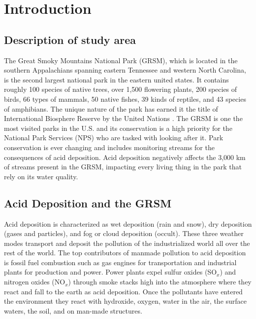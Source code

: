 \chapter{Introduction} \label{ch:intro}

\section{Description of study area}

The Great Smoky Mountains National Park (GRSM), which is located in the southern Appalachians spanning eastern Tennessee and western North Carolina, is the second largest national park in the eastern united states.
It contains roughly 100 species of native trees, over 1,500 flowering plants, 200 species of birds, 66 types of mammals, 50 native fishes, 39 kinds of reptiles, and 43 species of amphibians.
The unique nature of the park has earned it the title of  International Biosphere Reserve by the United Nations \citep{NPS}.    
The GRSM is one the most visited parks in the U.S. and its conservation is a high priority for the National Park Services (NPS) who are tasked with looking after it.        
Park conservation is ever changing and  includes monitoring streams for the consequences of acid deposition.    
Acid deposition negatively affects the 3,000 km of streams present in the GRSM, impacting every living thing in the park that rely on its water quality.  
    
\section{Acid Deposition and the GRSM}

Acid deposition is characterized as wet deposition (rain and snow), dry deposition (gases and particles), and fog or cloud deposition (occult).
These three weather modes transport and deposit the pollution of the industrialized world all over the rest of the world.
The top contributors of  manmade pollution to acid deposition is fossil fuel combustion such as gas engines for transportation and industrial plants for production and power.
Power plants expel sulfur oxides (SO$_x$) and nitrogen oxides (NO$_x$) through smoke stacks high into the atmosphere where they react and fall to the earth as acid deposition.
Once the pollutants have entered the environment they react with hydroxide, oxygen, water in the air, the surface waters, the soil, and on man-made structures\citep{board1983acid}. 
 
